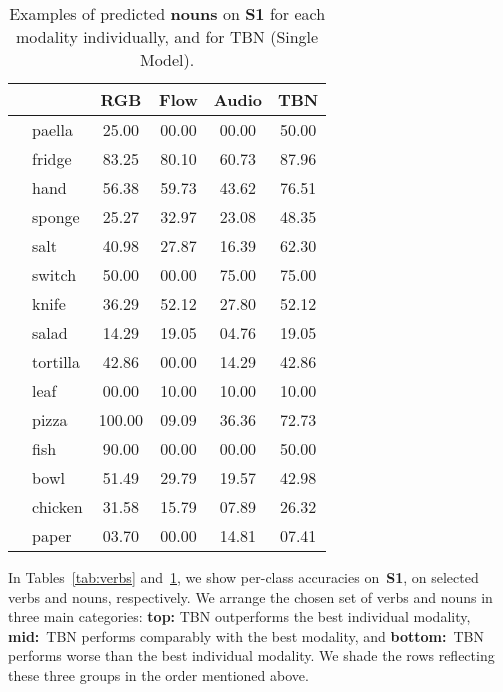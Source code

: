 \documentclass[10pt,twocolumn,letterpaper]{article}
\begin{document}
\begin{table}[t!]
    \centering
    {
    \begin{tabular}{ll|c|c|c|c}
         & &  RGB & Flow & Audio & TBN\\
         \hline
        \rowcolor{gray}
         & paella & 25.00 & 00.00 & 00.00 & 50.00\\
         \rowcolor{gray}
         & fridge & 83.25 & 80.10 & 60.73 & 87.96\\
         \rowcolor{gray}
         & hand & 56.38 & 59.73 & 43.62 & 76.51\\
         \rowcolor{gray}
         & sponge & 25.27 & 32.97 & 23.08 & 48.35\\
         \rowcolor{gray}
         & salt & 40.98 & 27.87 & 16.39 & 62.30\\
         \rowcolor{mediumgray}
         & switch & 50.00 & 00.00 & 75.00 & 75.00\\
         \rowcolor{mediumgray}
         & knife & 36.29 & 52.12 & 27.80 & 52.12\\
         \rowcolor{mediumgray}
         & salad & 14.29 & 19.05 & 04.76 & 19.05\\
         \rowcolor{mediumgray}
         & tortilla & 42.86 & 00.00 & 14.29 & 42.86\\
         \rowcolor{mediumgray}
         & leaf & 00.00 & 10.00 & 10.00 & 10.00\\
         \rowcolor{lightgray}
         & pizza & 100.00 & 09.09 & 36.36 & 72.73\\
         \rowcolor{lightgray}
         & fish & 90.00 & 00.00 & 00.00 & 50.00\\
         \rowcolor{lightgray}
        \rowcolor{lightgray}
         & bowl & 51.49 & 29.79 & 19.57 & 42.98\\
        \rowcolor{lightgray}
         & chicken & 31.58 & 15.79 & 07.89 & 26.32\\
         \rowcolor{lightgray}
         & paper & 03.70 & 00.00 & 14.81 & 07.41
    \end{tabular}}
    \caption{Examples of predicted \textbf{nouns} on \textbf{S1} for each modality individually, and for TBN (Single Model).}
    \label{tab:nouns}
\end{table}
 
 In Tables~\ref{tab:verbs} and~\ref{tab:nouns}, we show per-class accuracies on~\textbf{S1}, on selected verbs and nouns, respectively. We arrange the chosen set of verbs and nouns in three main categories: \textbf{top:} TBN outperforms the best individual modality, \textbf{mid:}~TBN performs comparably with the best modality, and \textbf{bottom:}~TBN performs worse than the best individual modality.  We shade the rows reflecting these three groups in the order mentioned above. 
\end{document}
